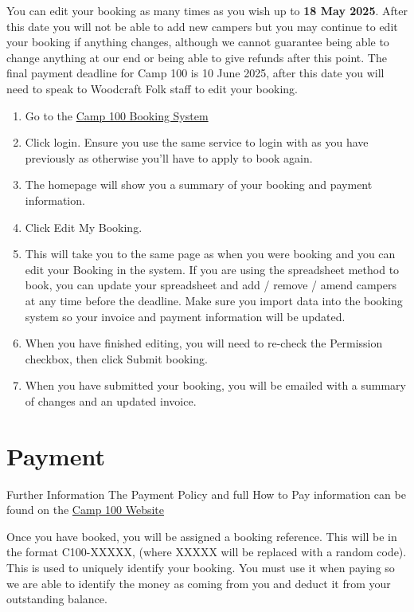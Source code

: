 \documentclass[a4paper, 11pt]{report}
\begin{document}
You can edit your booking as many times as you wish up to \textbf{18 May 2025}. After this date you will not be able to add new campers but you may continue to edit your booking if anything changes, although we cannot guarantee being able to change anything at our end or being able to give refunds after this point. The final payment deadline for Camp 100 is 10 June 2025, after this date you will need to speak to Woodcraft Folk staff to edit your booking. 
\begin{enumerate}
    \item Go to the \href{https://bookings.camp100.org.uk}{Camp 100 Booking System}
    \item Click login. Ensure you use the same service to login with as you have previously as otherwise you'll have to apply to book again.
    \item The homepage will show you a summary of your booking and payment information.
    \item Click Edit My Booking.
    \item This will take you to the same page as when you were booking and you can edit your Booking in the system. If you are using the spreadsheet method to book, you can update your spreadsheet and add / remove / amend campers at any time before the deadline. Make sure you import data into the booking system so your invoice and payment information will be updated.
    \item When you have finished editing, you will need to re-check the Permission checkbox, then click Submit booking.
    \item When you have submitted your booking, you will be emailed with a summary of changes and an updated invoice.
\end{enumerate}

\chapter{Payment}
\label{chap:payment}

\begin{callout-orange}{Further Information}
The Payment Policy and full How to Pay information can be found on the \href{https://camp100.org.uk}{Camp 100 Website}
\end{callout-orange}

Once you have booked, you will be assigned a booking reference. This will be in the format C100-XXXXX, (where XXXXX will be replaced with a random code). This is used to uniquely identify your booking. You must use it when paying so we are able to identify the money as coming from you and deduct it from your outstanding balance.
\end{document}
